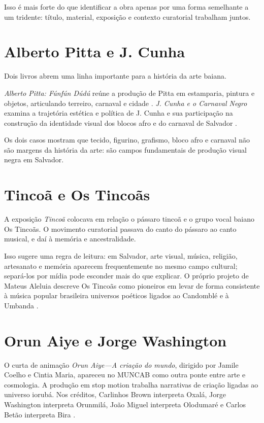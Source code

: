 Isso é mais forte do que identificar a obra
apenas por uma forma semelhante a
um tridente: título, material, exposição e
contexto curatorial trabalham
juntos.

\section{Alberto Pitta e J. Cunha}
\label{section-alberto-pitta-j-cunha}
Dois livros abrem uma
linha importante para a história
da arte baiana.

\emph{Alberto Pitta: Fúnfún Dúdú} reúne a
produção de Pitta em estamparia,
pintura e objetos, articulando terreiro,
carnaval e cidade
\cite{barata2025pitta}. \emph{J. Cunha e o
Carnaval Negro} examina a
trajetória estética e política de J. Cunha e
sua participação na construção da
identidade visual dos blocos afro e do
carnaval de Salvador
\cite{barata2024jcunha}.

Os dois casos mostram que tecido, figurino,
grafismo, bloco afro e carnaval não
são margens da história da arte: são campos
fundamentais de produção visual
negra em Salvador.

\section{Tincoã e Os Tincoãs}
\label{section-tincoa-tincoas}
A exposição \emph{Tincoã} colocava em relação
o pássaro tincoã e o grupo vocal
baiano Os Tincoãs. O movimento curatorial
passava do canto do pássaro ao canto
musical, e daí à memória e ancestralidade.

Isso sugere uma regra de leitura:
em Salvador, arte visual,
música, religião, artesanato e memória
aparecem frequentemente no mesmo campo
cultural; separá-los por mídia pode esconder
mais do que explicar. O próprio
projeto de Mateus Aleluia descreve Os Tincoãs
como pioneiros em levar de forma
consistente à música popular brasileira
universos poéticos ligados ao
Candomblé e à Umbanda
\cite{nacoes-candomble-projeto}.


\section{Orun Aiye e Jorge Washington}
\label{section-orun-aiye-jorge-washington}
O curta de animação \emph{Orun Aiye---A
criação do mundo}, dirigido por
Jamile Coelho e Cintia Maria, apareceu no
MUNCAB como outra ponte entre arte e
cosmologia. A produção em stop motion
trabalha narrativas de criação ligadas
ao universo iorubá. Nos créditos, Carlinhos
Brown interpreta Oxalá, Jorge
Washington interpreta Orunmilá, João Miguel
interpreta Olodumaré e Carlos
Betão interpreta Bira
\cite{orun-aiye-sepromi}.

